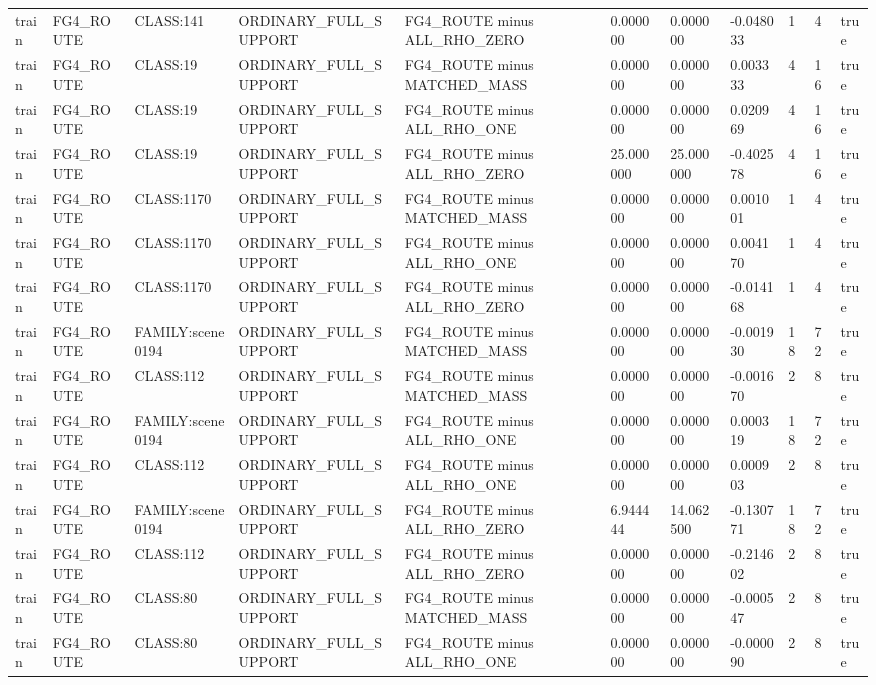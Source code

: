 \begin{tabular}{lllllllllll}
train & FG4\_ROUTE & CLASS:141 & ORDINARY\_FULL\_SUPPORT & FG4\_ROUTE minus ALL\_RHO\_ZERO & 0.000000 & 0.000000 & -0.048033 & 1 & 4 & true \\
train & FG4\_ROUTE & CLASS:19 & ORDINARY\_FULL\_SUPPORT & FG4\_ROUTE minus MATCHED\_MASS & 0.000000 & 0.000000 & 0.003333 & 4 & 16 & true \\
train & FG4\_ROUTE & CLASS:19 & ORDINARY\_FULL\_SUPPORT & FG4\_ROUTE minus ALL\_RHO\_ONE & 0.000000 & 0.000000 & 0.020969 & 4 & 16 & true \\
train & FG4\_ROUTE & CLASS:19 & ORDINARY\_FULL\_SUPPORT & FG4\_ROUTE minus ALL\_RHO\_ZERO & 25.000000 & 25.000000 & -0.402578 & 4 & 16 & true \\
train & FG4\_ROUTE & CLASS:1170 & ORDINARY\_FULL\_SUPPORT & FG4\_ROUTE minus MATCHED\_MASS & 0.000000 & 0.000000 & 0.001001 & 1 & 4 & true \\
train & FG4\_ROUTE & CLASS:1170 & ORDINARY\_FULL\_SUPPORT & FG4\_ROUTE minus ALL\_RHO\_ONE & 0.000000 & 0.000000 & 0.004170 & 1 & 4 & true \\
train & FG4\_ROUTE & CLASS:1170 & ORDINARY\_FULL\_SUPPORT & FG4\_ROUTE minus ALL\_RHO\_ZERO & 0.000000 & 0.000000 & -0.014168 & 1 & 4 & true \\
train & FG4\_ROUTE & FAMILY:scene0194 & ORDINARY\_FULL\_SUPPORT & FG4\_ROUTE minus MATCHED\_MASS & 0.000000 & 0.000000 & -0.001930 & 18 & 72 & true \\
train & FG4\_ROUTE & CLASS:112 & ORDINARY\_FULL\_SUPPORT & FG4\_ROUTE minus MATCHED\_MASS & 0.000000 & 0.000000 & -0.001670 & 2 & 8 & true \\
train & FG4\_ROUTE & FAMILY:scene0194 & ORDINARY\_FULL\_SUPPORT & FG4\_ROUTE minus ALL\_RHO\_ONE & 0.000000 & 0.000000 & 0.000319 & 18 & 72 & true \\
train & FG4\_ROUTE & CLASS:112 & ORDINARY\_FULL\_SUPPORT & FG4\_ROUTE minus ALL\_RHO\_ONE & 0.000000 & 0.000000 & 0.000903 & 2 & 8 & true \\
train & FG4\_ROUTE & FAMILY:scene0194 & ORDINARY\_FULL\_SUPPORT & FG4\_ROUTE minus ALL\_RHO\_ZERO & 6.944444 & 14.062500 & -0.130771 & 18 & 72 & true \\
train & FG4\_ROUTE & CLASS:112 & ORDINARY\_FULL\_SUPPORT & FG4\_ROUTE minus ALL\_RHO\_ZERO & 0.000000 & 0.000000 & -0.214602 & 2 & 8 & true \\
train & FG4\_ROUTE & CLASS:80 & ORDINARY\_FULL\_SUPPORT & FG4\_ROUTE minus MATCHED\_MASS & 0.000000 & 0.000000 & -0.000547 & 2 & 8 & true \\
train & FG4\_ROUTE & CLASS:80 & ORDINARY\_FULL\_SUPPORT & FG4\_ROUTE minus ALL\_RHO\_ONE & 0.000000 & 0.000000 & -0.000090 & 2 & 8 & true \\

\end{tabular}
